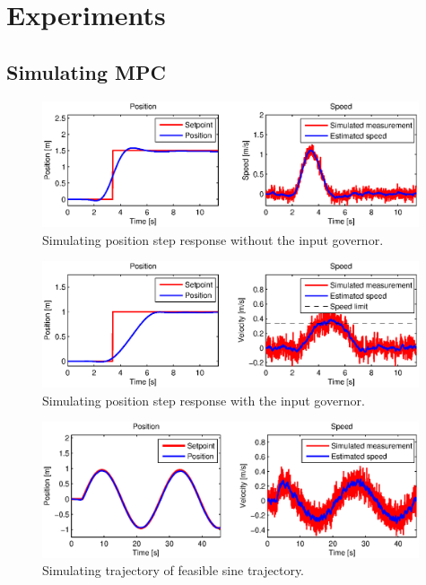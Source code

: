 \section{Experiments}

\subsection{Simulating MPC}

\begin{figure}[H]
\centering
\includegraphics[width=0.99\textwidth]{fig/simulation1_step_no_governor.eps}
\caption{Simulating position step response without the input governor.}
\label{fig:simulation_step_no_governor}
\end{figure}

\begin{figure}[H]
\centering
\includegraphics[width=0.99\textwidth]{fig/simulation2_step_governor.eps}
\caption{Simulating position step response with the input governor.}
\label{fig:simulation_step_governor}
\end{figure}

\begin{figure}[H]
\centering
\includegraphics[width=0.99\textwidth]{fig/simulation3_sine.eps}
\caption{Simulating trajectory of feasible sine trajectory.}
\label{fig:simulation_step_governor}
\end{figure}

